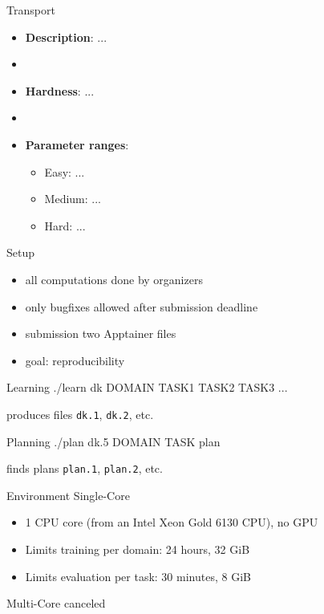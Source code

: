 \documentclass[aspectratio=169,xcolor=dvipsnames]{beamer}
\begin{document}
\begin{frame}{Transport}

    \begin{itemize}
        \item \textbf{Description}: ...
        \item[]
        \item \textbf{Hardness}: ...
        \item[]
        \item \textbf{Parameter ranges}:
        \begin{itemize}
            \item Easy: ...
            \item Medium: ...
            \item Hard: ...
        \end{itemize}
    \end{itemize}

\end{frame}

\begin{frame}{Setup}
    \begin{itemize}
        \item all computations done by organizers
        \item only bugfixes allowed after submission deadline
        \item submission two Apptainer files
        \item goal: reproducibility
    \end{itemize}

    \begin{block}{Learning}
        ./learn dk DOMAIN TASK1 TASK2 TASK3 ...
    \end{block}

    produces files \texttt{dk.1}, \texttt{dk.2}, etc.

    \begin{exampleblock}{Planning}
        ./plan dk.5 DOMAIN TASK plan
    \end{exampleblock}

    finds plans \texttt{plan.1}, \texttt{plan.2}, etc.
\end{frame}

\begin{frame}{Environment}
    Single-Core
    \begin{itemize}
        \item 1 CPU core (from an Intel Xeon Gold 6130 CPU), no GPU
        \item Limits \alert{training} per domain: 24 hours, 32 GiB
        \item Limits \alert{evaluation} per task: 30 minutes, 8 GiB
    \end{itemize}

    \bigskip
    Multi-Core canceled
\end{frame}
\end{document}
